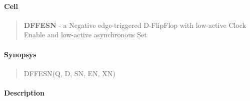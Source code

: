 \label{DFFESN}
\paragraph{Cell}
\begin{quote}
    \textbf{DFFESN} - a Negative edge-triggered D-FlipFlop with low-active Clock Enable and low-active asynchronous Set
\end{quote}

\paragraph{Synopsys}
\begin{quote}
    DFFESN(Q, D, SN, EN, XN)
\end{quote}

\paragraph{Description}

%

